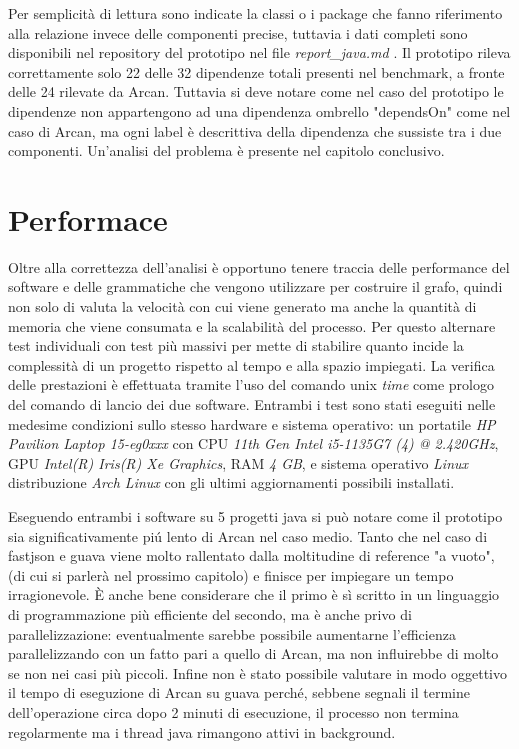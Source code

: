 Per semplicit\`a di lettura sono indicate la classi o i package che fanno riferimento alla relazione invece delle componenti precise, tuttavia i dati completi sono disponibili nel repository del prototipo nel file \emph{report\_java.md} \cite{SkullianRepository}. Il prototipo rileva correttamente solo 22 delle 32 dipendenze totali presenti nel benchmark, a fronte delle 24 rilevate da Arcan. Tuttavia si deve notare come nel caso del prototipo le dipendenze non appartengono ad una dipendenza ombrello "dependsOn" come nel caso di Arcan, ma ogni label \`e descrittiva della dipendenza che sussiste tra i due componenti. Un'analisi del problema \`e presente nel capitolo conclusivo.

\section{Performace}

Oltre alla correttezza dell'analisi \`e opportuno tenere traccia delle performance del software e delle grammatiche che vengono utilizzare per costruire il grafo, quindi non solo di valuta la velocit\`a con cui viene generato ma anche la quantit\`a di memoria che viene consumata e la scalabilit\`a del processo.
Per questo alternare test individuali con test pi\`u massivi per mette di stabilire quanto incide la complessit\`a di un progetto rispetto al tempo e alla spazio impiegati. La verifica delle prestazioni \`e effettuata tramite l'uso del comando unix \emph{time} come prologo del comando di lancio dei due software.
Entrambi i test sono stati eseguiti nelle medesime condizioni sullo stesso hardware e sistema operativo: un portatile \emph{HP Pavilion Laptop 15-eg0xxx} con CPU \emph{11th Gen Intel i5-1135G7 (4) @ 2.420GHz}, GPU \emph{Intel(R) Iris(R) Xe Graphics}, RAM \emph{4 GB}, e sistema operativo \emph{Linux} distribuzione \emph{Arch Linux} con gli ultimi aggiornamenti possibili installati.

Eseguendo entrambi i software su 5 progetti java si pu\`o notare come il prototipo sia significativamente pi\'u lento di Arcan nel caso medio. Tanto che nel caso di fastjson e guava viene molto rallentato dalla moltitudine di reference "a vuoto", (di cui si parler\`a nel prossimo capitolo) e finisce per impiegare un tempo irragionevole. \`E anche bene considerare che il primo \`e s\`i scritto in un linguaggio di programmazione pi\`u efficiente del secondo, ma \`e anche privo di parallelizzazione: eventualmente sarebbe possibile aumentarne l'efficienza parallelizzando con un fatto pari a quello di Arcan, ma non influirebbe di molto se non nei casi pi\`u piccoli.
Infine non \`e stato possibile valutare in modo oggettivo il tempo di eseguzione di Arcan su guava perch\'e, sebbene segnali il termine dell'operazione circa dopo 2 minuti di esecuzione, il processo non termina regolarmente ma i thread java rimangono attivi in background.

